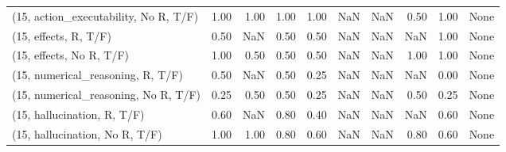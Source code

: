 \begin{table*}[h!]
\begin{adjustbox}{width=2\columnwidth,center}
\begin{tabular}{lrrr|rrr|rrr}
(15, action\_executability, No R, T/F) &                      1.00 &                  1.00 &                      1.00 &                          1.00 &                       NaN &                           NaN &                                   0.50 &                               1.00 &                                  None \\
(15, effects, R, T/F)                 &                      0.50 &                   NaN &                      0.50 &                          0.50 &                       NaN &                           NaN &                                    NaN &                               1.00 &                                  None \\
(15, effects, No R, T/F)              &                      1.00 &                  0.50 &                      0.50 &                          0.50 &                       NaN &                           NaN &                                   1.00 &                               1.00 &                                  None \\
(15, numerical\_reasoning, R, T/F)     &                      0.50 &                   NaN &                      0.50 &                          0.25 &                       NaN &                           NaN &                                    NaN &                               0.00 &                                  None \\
(15, numerical\_reasoning, No R, T/F)  &                      0.25 &                  0.50 &                      0.50 &                          0.25 &                       NaN &                           NaN &                                   0.50 &                               0.25 &                                  None \\
(15, hallucination, R, T/F)           &                      0.60 &                   NaN &                      0.80 &                          0.40 &                       NaN &                           NaN &                                    NaN &                               0.60 &                                  None \\
(15, hallucination, No R, T/F)        &                      1.00 &                  1.00 &                      0.80 &                          0.60 &                       NaN &                           NaN &                                   0.80 &                               0.60 &                                  None \\

\end{tabular}
\end{adjustbox}
\end{table*}
